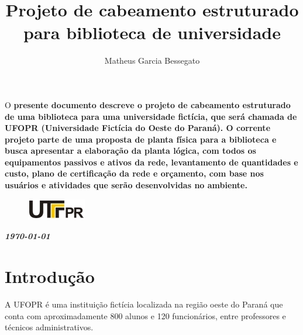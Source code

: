 \documentclass[	DIV=calc,%
							paper=a4,%
							fontsize=12pt,%
							onecolumn]{scrartcl}	 					%
\title{Projeto de cabeamento estruturado para biblioteca de universidade}					%
\author{Matheus Garcia Bessegato}  	%
\date{}																				%
\newcommand{\initial}[1]{%
     \lettrine[lines=3,lhang=0.3,nindent=0em]{
     				\color{DarkGoldenrod}
     				{\textsf{#1}}}{}}
\begin{document}
\maketitle
\thispagestyle{fancy} 	
\thispagestyle{empty}		%




\initial{O}\textbf{ presente documento descreve o projeto de cabeamento estruturado de uma biblioteca para uma universidade fictícia, que será chamada de UFOPR (Universidade Fictícia do Oeste do Paraná). O corrente projeto parte de uma proposta de planta física para a biblioteca e busca apresentar a elaboração da planta lógica, com todos os equipamentos passivos e ativos da rede, levantamento de quantidades e custo, plano de certificação da rede e orçamento, com base nos usuários e atividades que serão desenvolvidas no ambiente.}

\begin{figure}
	\centering
	\includegraphics{utfpr}
\end{figure}

\vspace{3cm}
\centerline{\textit{\textbf{\today}}}

\clearpage
    \renewcommand*\listfigurename{Lista de figuras}
\listoffigures

\renewcommand*\listtablename{Lista de tabelas}
\listoftables




\clearpage
\renewcommand{\contentsname}{Sumário}
\tableofcontents
\clearpage

\section{Introdução}
A UFOPR é uma instituição fictícia localizada na região oeste do Paraná que conta com aproximadamente 800 alunos e 120 funcionários, entre professores e técnicos administrativos.
\end{document}
